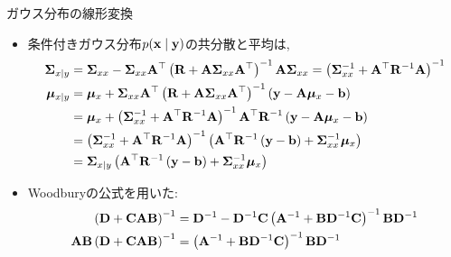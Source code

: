 \documentclass[dvipdfmx,notheorems,t]{beamer}
\begin{document}
\begin{frame}{ガウス分布の線形変換}
\begin{itemize}
  \item 条件付きガウス分布$p(\vb{x} \mid \vb{y})$の共分散と平均は,
  {\small \begin{align*}
    \vb{\Sigma}_{x \mid y} &= \vb{\Sigma}_{xx} - \vb{\Sigma}_{xx} \vb{A}^\top
      \left( \vb{R} + \vb{A} \vb{\Sigma}_{xx} \vb{A}^\top \right)^{-1}
      \vb{A} \vb{\Sigma}_{xx}
    = \left( \vb{\Sigma}_{xx}^{-1} + \vb{A}^\top \vb{R}^{-1} \vb{A} \right)^{-1} \\
    \vb*{\mu}_{x \mid y} &= \vb*{\mu}_x + \vb{\Sigma}_{xx} \vb{A}^\top
      \left( \vb{R} + \vb{A} \vb{\Sigma}_{xx} \vb{A}^\top \right)^{-1}
      \left( \vb{y} - \vb{A} \vb*{\mu}_x - \vb{b} \right) \\
    &= \vb*{\mu}_x + \left( \vb{\Sigma}_{xx}^{-1} + \vb{A}^\top \vb{R}^{-1} \vb{A} \right)^{-1}
      \vb{A}^\top \vb{R}^{-1} \left( \vb{y} - \vb{A} \vb*{\mu}_x - \vb{b} \right) \\
    &= \left( \vb{\Sigma}_{xx}^{-1} + \vb{A}^\top \vb{R}^{-1} \vb{A} \right)^{-1}
      \left( \vb{A}^\top \vb{R}^{-1} \left( \vb{y} - \vb{b} \right) + \vb{\Sigma}_{xx}^{-1} \vb*{\mu}_x \right) \\
    &= \vb{\Sigma}_{x \mid y}
      \left( \vb{A}^\top \vb{R}^{-1} \left( \vb{y} - \vb{b} \right) + \vb{\Sigma}_{xx}^{-1} \vb*{\mu}_x \right)
  \end{align*}}
  \item Woodburyの公式を用いた:
  {\small \begin{align*}
    \left( \vb{D} + \vb{C} \vb{A} \vb{B} \right)^{-1}
      &= \vb{D}^{-1} - \vb{D}^{-1} \vb{C}
        \left( \vb{A}^{-1} + \vb{B} \vb{D}^{-1} \vb{C} \right)^{-1} \vb{B} \vb{D}^{-1} \\
    \vb{A} \vb{B} \left( \vb{D} + \vb{C} \vb{A} \vb{B} \right)^{-1}
      &= \left( \vb{A}^{-1} + \vb{B} \vb{D}^{-1} \vb{C} \right)^{-1} \vb{B} \vb{D}^{-1} \\
  \end{align*}}
\end{itemize}
\end{frame}
\end{document}
